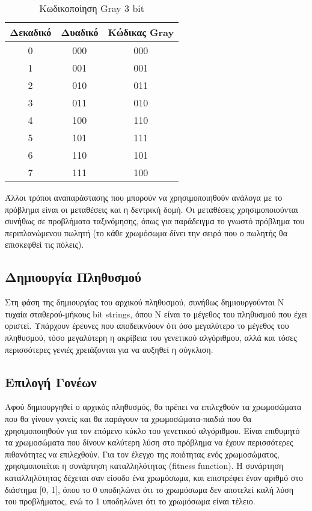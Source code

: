 \begin{table}[!t]
    \renewcommand{\arraystretch}{1.3}
    \caption{Κωδικοποίηση Gray 3 bit}
    \label{table_gray_code}
    \centering
    \begin{tabular}{c|c|c}
        \hline
        \bfseries Δεκαδικό & \bfseries Δυαδικό & \bfseries Κώδικας Gray\\
        \hline\hline
        0 & 000 & 000\\
        1 & 001 & 001\\
        2 & 010 & 011\\
        3 & 011 & 010\\
        4 & 100 & 110\\
        5 & 101 & 111\\
        6 & 110 & 101\\
        7 & 111 & 100\\
        \hline
    \end{tabular}
\end{table}

Άλλοι τρόποι αναπαράστασης που μπορούν να χρησιμοποιηθούν ανάλογα με το πρόβλημα είναι οι μεταθέσεις και η δεντρική δομή. Οι μεταθέσεις χρησιμοποιούνται συνήθως σε προβλήματα ταξινόμησης, όπως για παράδειγμα το γνωστό πρόβλημα του περιπλανώμενου πωλητή (το κάθε χρωμόσωμα δίνει την σειρά που ο πωλητής θα επισκεφθεί τις πόλεις). \cite{Obitko}

\subsection{Δημιουργία Πληθυσμού}

Στη φάση της δημιουργίας του αρχικού πληθυσμού, συνήθως δημιουργούνται Ν τυχαία σταθερού-μήκους bit strings, όπου Ν είναι το μέγεθος του πληθυσμού που έχει οριστεί. Υπάρχουν έρευνες που αποδεικνύουν ότι όσο μεγαλύτερο το μέγεθος του πληθυσμού, τόσο μεγαλύτερη η ακρίβεια του γενετικού αλγόριθμου, αλλά και τόσες περισσότερες γενιές χρειάζονται για να αυξηθεί η σύγκλιση. \cite{Gotshall2008}

\subsection{Επιλογή Γονέων}

Αφού δημιουργηθεί ο αρχικός πληθυσμός, θα πρέπει να επιλεχθούν τα χρωμοσώματα που θα γίνουν γονείς και θα παράγουν τα χρωμοσώματα-παιδιά που θα χρησιμοποιηθούν για τον επόμενο κύκλο του γενετικού αλγόριθμου. Είναι επιθυμητό τα χρωμοσώματα που δίνουν καλύτερη λύση στο πρόβλημα να έχουν περισσότερες πιθανότητες να επιλεχθούν. Για τον έλεγχο της ποιότητας ενός χρωμοσώματος, χρησιμοποιείται η συνάρτηση καταλληλότητας (fitness function). Η συνάρτηση καταλληλότητας δέχεται σαν είσοδο ένα χρωμόσωμα, και επιστρέφει έναν αριθμό στο διάστημα [0, 1], όπου το 0 υποδηλώνει ότι το χρωμόσωμα δεν αποτελεί καλή λύση του προβλήματος, ενώ το 1 υποδηλώνει ότι το χρωμόσωμα είναι τέλειο.

